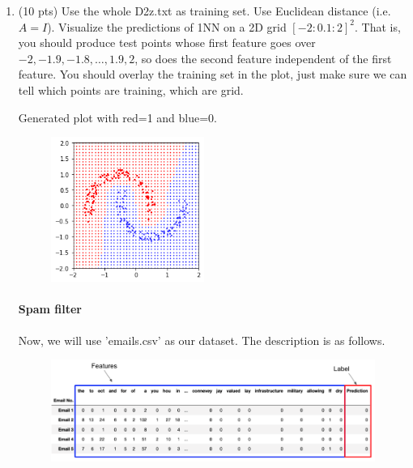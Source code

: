 \documentclass[a4paper]{article}
\theoremstyle{definition}
\newenvironment{soln}{
    \leavevmode\color{blue}\ignorespaces
}{}
\begin{document}
\begin{enumerate}
	\item (10 pts) Use the whole D2z.txt as training set.  Use Euclidean distance (i.e. $A=I$).
	Visualize the predictions of 1NN on a 2D grid $[-2:0.1:2]^2$.
	That is, you should produce test points whose first feature goes over $-2, -1.9, -1.8, \ldots, 1.9, 2$, so does the second feature independent of the first feature.
	You should overlay the training set in the plot, just make sure we can tell which points are training, which are grid.
 
	\begin{soln}  Generated plot with red=1 and blue=0. \end{soln}
	\begin{figure}[h]
		\centering
		\includegraphics[width=5cm]{fig1.png}
	\end{figure}
	
	\paragraph{Spam filter} Now, we will use 'emails.csv' as our dataset. The description is as follows.
	\begin{figure}[h]
		\centering
		\includegraphics[width=\linewidth]{email_head.png}
	\end{figure}
	

\end{enumerate}
\end{document}
